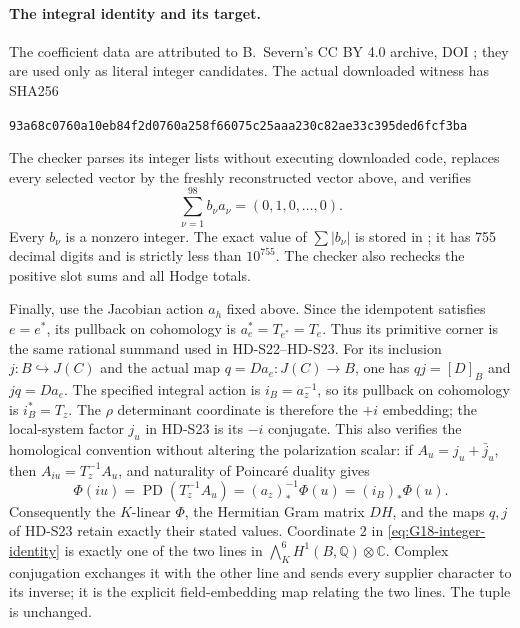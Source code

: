 \paragraph{The integral identity and its target.}
The coefficient data are attributed to B.\ Severn's CC BY 4.0
archive, DOI ; they are used only as
literal integer candidates. The actual downloaded witness has SHA256
\begin{center}\small\texttt{93a68c0760a10eb8\allowbreak 4f2d0760a258f660\allowbreak 75c25aaa230c82ae\allowbreak 33c395ded6fcf3ba}\end{center}
The checker parses its integer lists without executing downloaded code,
replaces every selected vector by the freshly reconstructed vector above,
and verifies
\begin{equation}\label{eq:G18-integer-identity}
             \sum_{\nu=1}^{98} b_\nu a_\nu=(0,1,0,\ldots,0).
\end{equation}
Every \(b_\nu\) is a nonzero integer. The exact value of
\(\sum|b_\nu|\) is stored in ; it has
755 decimal digits and is strictly less than \(10^{755}\).
The checker also rechecks the positive slot sums and all Hodge totals.

Finally, use the Jacobian action \(a_h\) fixed above. Since the
idempotent satisfies \(e=e^*\), its pullback on cohomology is
\(a_e^*=T_{e^*}=T_e\). Thus its primitive corner is the same
rational summand used in HD-S22--HD-S23.
For its inclusion \(j:B\hookrightarrow J(C)\) and the actual map
\(q=Da_e:J(C)\to B\), one has
\(qj=[D]_B\) and \(jq=Da_e\).
The specified integral action is \(i_B=a_z^{-1}\), so its
pullback on cohomology is \(i_B^*=T_z\).
The \(\rho\) determinant coordinate is therefore the \(+i\)
embedding; the local-system factor \(j_u\) in HD-S23 is its
\(-i\) conjugate. This also verifies the homological convention
without altering the polarization scalar: if
\(A_u=j_u+\bar j_u\), then \(A_{iu}=T_z^{-1}A_u\), and naturality
of Poincar\'e duality gives
\[
 \Phi(iu)=\operatorname{PD}(T_z^{-1}A_u)
         =(a_z)_*^{-1}\Phi(u)=(i_B)_*\Phi(u).
\]
Consequently the \(K\)-linear \(\Phi\), the Hermitian Gram matrix
\(DH\), and the maps \(q,j\) of HD-S23 retain exactly their stated
values. Coordinate 2 in
\eqref{eq:G18-integer-identity} is exactly one of the two lines in
\(\bigwedge_K^6H^1(B,\mathbb Q)\otimes\mathbb C\).
Complex conjugation exchanges it with the other line and sends every
supplier character to its inverse; it is the explicit field-embedding
map relating the two lines. The tuple is unchanged.

